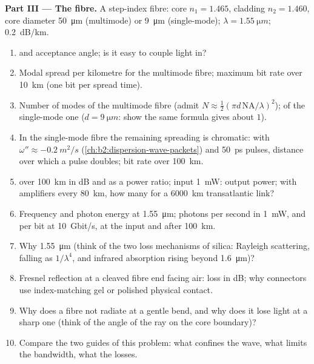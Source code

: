 \begin{problem}
\medskip
\noindent\textbf{Part III --- The fibre.}
A step-index fibre: core $n_1 = 1.465$, cladding $n_2 = 1.460$, core
diameter \qty{50}{\micro m} (multimode) or \qty{9}{\micro m} (single-mode);
$\lambda = \qty{1.55}{\micro m}$;  \qty{0.2}{dB/km}.
\begin{enumerate}[resume]
  \item {} and acceptance angle; is it easy to couple
        light in?
  \item Modal spread per kilometre for the multimode fibre; maximum
        bit rate over \qty{10}{km} (one bit per spread time).
  \item Number of modes of the multimode fibre (admit $N \approx
        \tfrac12(\pi d\,\mathrm{NA}/\lambda)^2$); of the single-mode one ($d =
        \qty{9}{\micro m}$: show the same formula gives about $1$).
  \item In the single-mode fibre the remaining spreading is chromatic:
        with $\omega'' \approx \qty{-0.2}{m^2/s}$ (\cref{ch:b2:dispersion-wave-packets})
        and \qty{50}{ps} pulses, distance over which a pulse doubles;
        bit rate over \qty{100}{km}.
  \item {} over \qty{100}{km} in dB and as a power ratio; input
        \qty{1}{mW}: output power; with amplifiers every \qty{80}{km}, how
        many for a \qty{6000}{km} transatlantic link?
  \item Frequency and photon energy at \qty{1.55}{\micro m}; photons per
        second in \qty{1}{mW}, and per bit at \qty{10}{Gbit/s}, at the input
        and after \qty{100}{km}.
  \item Why \qty{1.55}{\micro m} (think of the two loss mechanisms of
        silica: Rayleigh scattering, falling as $1/\lambda^4$, and infrared
        absorption rising beyond \qty{1.6}{\micro m})?
  \item Fresnel reflection at a cleaved fibre end facing air: loss in
        dB; why connectors use index-matching gel or polished physical
        contact.
  \item Why does a fibre not radiate at a gentle bend, and why does
        it lose light at a sharp one (think of the angle of the ray
        on the core boundary)?
  \item Compare the two guides of this problem: what confines the
        wave, what limits the bandwidth, what the losses.
\end{enumerate}
\end{problem}
